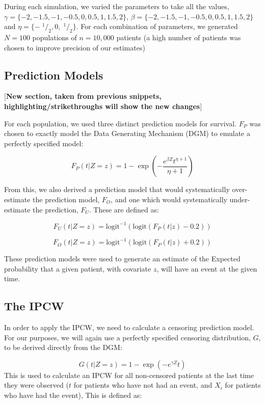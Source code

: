 \documentclass[
]{article}
\newcommand{\txt}[1]{\textrm{#1}}
\def\logit{\txt{logit}}
\newcommand{\sfrac}[2]{\;^{#1}/_{#2}}
\begin{document}
During each simulation, we varied the parameters to take all the values,\(\gamma = \{-2,-1.5,-1,-0.5,0,0.5,1,1.5,2\}\), \(\beta = \{-2,-1.5,-1,-0.5,0,0.5,1,1.5,2\}\) and \(\eta = \{-\sfrac{1}{2},0,\sfrac{1}{2}\}\). For each combination of parameters, we generated \(N = 100\) populations of \(n = 10,000\) patients (a high number of patients was chosen to improve precision of our estimates)

\hypertarget{prediction-models}{%
\subsection{Prediction Models}\label{prediction-models}}

{[}\textbf{New section, taken from previous snippets, highlighting/strikethroughs will show the new changes}{]}

For each population, we used three distinct prediction models for survival. \(F_P\) was chosen to exactly model the Data Generating Mechanism (DGM) to emulate a perfectly specified model:

\[
F_P(t|Z = z) = 1 - \exp\left(-\frac{e^{\beta Z}t^{\eta+1}}{\eta+1}\right)
\]

From this, we also derived a prediction model that would systematically over-estimate the prediction model, \(F_O\), and one which would systematically under-estimate the prediction, \(F_U\). These are defined as:

\[
F_U(t|Z=z) = \logit^{-1}\left(\logit\left( F_P(t|z) - 0.2\right)\right)
\]

\[
F_O(t|Z=z) = \logit^{-1}\left(\logit\left( F_P(t|z) + 0.2\right)\right)
\]

These prediction models were used to generate an estimate of the Expected probability that a given patient, with covariate \(z\), will have an event at the given time.

\hypertarget{the-ipcw}{%
\subsection{The IPCW}\label{the-ipcw}}

In order to apply the IPCW, we need to calculate a censoring prediction model. For our purposes, we will again use a perfectly specified censoring distribution, \(G\), to be derived directly from the DGM:

\[
G(t|Z=z) = 1-\exp\left(-e^{\gamma Z}t\right)
\]
This is used to calculate an IPCW for all non-censored patients at the last time they were observed (\(t\) for patients who have not had an event, and \(X_i\) for patients who have had the event), This is defined as:
\end{document}
